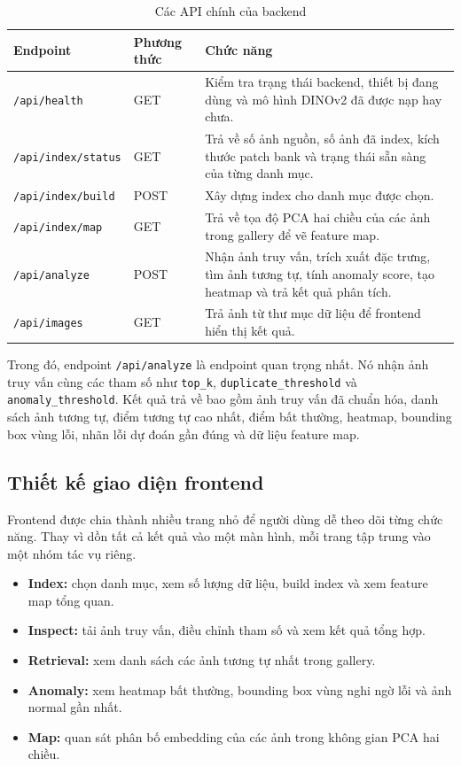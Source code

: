 \begin{table}[H]
    \centering
    \begin{tabular}{|l|l|p{8cm}|}
        \hline
        \textbf{Endpoint} & \textbf{Phương thức} & \textbf{Chức năng} \\
        \hline
        \texttt{/api/health} & GET & Kiểm tra trạng thái backend, thiết bị đang dùng và mô hình DINOv2 đã được nạp hay chưa. \\
        \hline
        \texttt{/api/index/status} & GET & Trả về số ảnh nguồn, số ảnh đã index, kích thước patch bank và trạng thái sẵn sàng của từng danh mục. \\
        \hline
        \texttt{/api/index/build} & POST & Xây dựng index cho danh mục được chọn. \\
        \hline
        \texttt{/api/index/map} & GET & Trả về tọa độ PCA hai chiều của các ảnh trong gallery để vẽ feature map. \\
        \hline
        \texttt{/api/analyze} & POST & Nhận ảnh truy vấn, trích xuất đặc trưng, tìm ảnh tương tự, tính anomaly score, tạo heatmap và trả kết quả phân tích. \\
        \hline
        \texttt{/api/images} & GET & Trả ảnh từ thư mục dữ liệu để frontend hiển thị kết quả. \\
        \hline
    \end{tabular}
    \caption{Các API chính của backend}
\end{table}

Trong đó, endpoint \texttt{/api/analyze} là endpoint quan trọng nhất. Nó nhận ảnh truy vấn cùng các tham số như \texttt{top\_k}, \texttt{duplicate\_threshold} và \texttt{anomaly\_threshold}. Kết quả trả về bao gồm ảnh truy vấn đã chuẩn hóa, danh sách ảnh tương tự, điểm tương tự cao nhất, điểm bất thường, heatmap, bounding box vùng lỗi, nhãn lỗi dự đoán gần đúng và dữ liệu feature map.

\subsection{Thiết kế giao diện frontend}
Frontend được chia thành nhiều trang nhỏ để người dùng dễ theo dõi từng chức năng. Thay vì dồn tất cả kết quả vào một màn hình, mỗi trang tập trung vào một nhóm tác vụ riêng.

\begin{itemize}
    \item \textbf{Index:} chọn danh mục, xem số lượng dữ liệu, build index và xem feature map tổng quan.
    \item \textbf{Inspect:} tải ảnh truy vấn, điều chỉnh tham số và xem kết quả tổng hợp.
    \item \textbf{Retrieval:} xem danh sách các ảnh tương tự nhất trong gallery.
    \item \textbf{Anomaly:} xem heatmap bất thường, bounding box vùng nghi ngờ lỗi và ảnh normal gần nhất.
    \item \textbf{Map:} quan sát phân bố embedding của các ảnh trong không gian PCA hai chiều.
\end{itemize}

